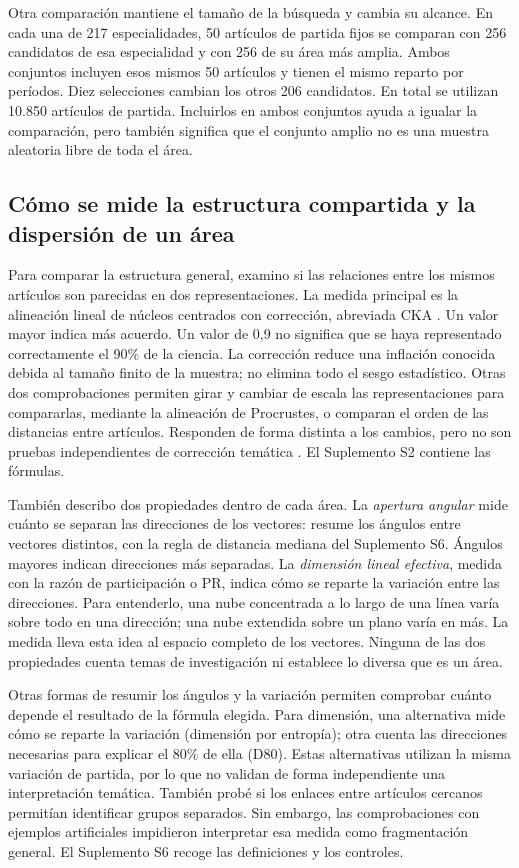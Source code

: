 \documentclass[12pt]{article}
\begin{document}
Otra comparación mantiene el tamaño de la búsqueda y cambia su alcance. En cada una de 217 especialidades, 50 artículos de partida fijos se comparan con 256 candidatos de esa especialidad y con 256 de su área más amplia. Ambos conjuntos incluyen esos mismos 50 artículos y tienen el mismo reparto por períodos. Diez selecciones cambian los otros 206 candidatos. En total se utilizan 10.850 artículos de partida. Incluirlos en ambos conjuntos ayuda a igualar la comparación, pero también significa que el conjunto amplio no es una muestra aleatoria libre de toda el área.

\subsection{Cómo se mide la estructura compartida y la dispersión de un área}
Para comparar la estructura general, examino si las relaciones entre los mismos artículos son parecidas en dos representaciones. La medida principal es la alineación lineal de núcleos centrados con corrección, abreviada CKA \citep{pmlr-v97-kornblith19a,refa961d84a4e}. Un valor mayor indica más acuerdo. Un valor de 0,9 no significa que se haya representado correctamente el 90\% de la ciencia. La corrección reduce una inflación conocida debida al tamaño finito de la muestra; no elimina todo el sesgo estadístico. Otras dos comprobaciones permiten girar y cambiar de escala las representaciones para compararlas, mediante la alineación de Procrustes, o comparan el orden de las distancias entre artículos. Responden de forma distinta a los cambios, pero no son pruebas independientes de corrección temática \citep{NEURIPS2021_252a3dba,pmlr-v285-williams24a}. El Suplemento S2 contiene las fórmulas.

También describo dos propiedades dentro de cada área. La \emph{apertura angular} mide cuánto se separan las direcciones de los vectores: resume los ángulos entre vectores distintos, con la regla de distancia mediana del Suplemento S6. Ángulos mayores indican direcciones más separadas. La \emph{dimensión lineal efectiva}, medida con la razón de participación o PR, indica cómo se reparte la variación entre las direcciones. Para entenderlo, una nube concentrada a lo largo de una línea varía sobre todo en una dirección; una nube extendida sobre un plano varía en más. La medida lleva esta idea al espacio completo de los vectores. Ninguna de las dos propiedades cuenta temas de investigación ni establece lo diversa que es un área.

Otras formas de resumir los ángulos y la variación permiten comprobar cuánto depende el resultado de la fórmula elegida. Para dimensión, una alternativa mide cómo se reparte la variación (dimensión por entropía); otra cuenta las direcciones necesarias para explicar el 80\% de ella (D80). Estas alternativas utilizan la misma variación de partida, por lo que no validan de forma independiente una interpretación temática. También probé si los enlaces entre artículos cercanos permitían identificar grupos separados. Sin embargo, las comprobaciones con ejemplos artificiales impidieron interpretar esa medida como fragmentación general. El Suplemento S6 recoge las definiciones y los controles.
\end{document}
